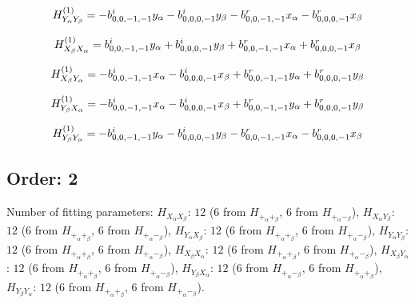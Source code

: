 \documentclass[fleqn]{article}
\begin{document}
\begin{dmath*}
H_{Y_{\alpha}Y_{\beta}}^{(1)}=-  b^{i}_{0,0,-1,-1} y_{\alpha} -  b^{i}_{0,0,0,-1} y_{\beta} -  b^{r}_{0,0,-1,-1} x_{\alpha} -  b^{r}_{0,0,0,-1} x_{\beta}\\
\end{dmath*}

\begin{dmath*}
H_{X_{\beta}X_{\alpha}}^{(1)}=b^{i}_{0,0,-1,-1} y_{\alpha} + b^{i}_{0,0,0,-1} y_{\beta} + b^{r}_{0,0,-1,-1} x_{\alpha} + b^{r}_{0,0,0,-1} x_{\beta}\\
\end{dmath*}

\begin{dmath*}
H_{X_{\beta}Y_{\alpha}}^{(1)}=-  b^{i}_{0,0,-1,-1} x_{\alpha} -  b^{i}_{0,0,0,-1} x_{\beta} +  b^{r}_{0,0,-1,-1} y_{\alpha} +  b^{r}_{0,0,0,-1} y_{\beta}\\
\end{dmath*}

\begin{dmath*}
H_{Y_{\beta}X_{\alpha}}^{(1)}=-  b^{i}_{0,0,-1,-1} x_{\alpha} -  b^{i}_{0,0,0,-1} x_{\beta} +  b^{r}_{0,0,-1,-1} y_{\alpha} +  b^{r}_{0,0,0,-1} y_{\beta}\\
\end{dmath*}

\begin{dmath*}
H_{Y_{\beta}Y_{\alpha}}^{(1)}=-  b^{i}_{0,0,-1,-1} y_{\alpha} -  b^{i}_{0,0,0,-1} y_{\beta} -  b^{r}_{0,0,-1,-1} x_{\alpha} -  b^{r}_{0,0,0,-1} x_{\beta}\\
\end{dmath*}
\subsection{Order: 2}
Number of fitting parameters: $H_{X_{\alpha}X_{\beta}}$: $12$ ($6$ from $H_{+_{\alpha}+_{\beta}}$, $6$ from $H_{+_{\alpha}-_{\beta}}$), $H_{X_{\alpha}Y_{\beta}}$: $12$ ($6$ from $H_{+_{\alpha}+_{\beta}}$, $6$ from $H_{+_{\alpha}-_{\beta}}$), $H_{Y_{\alpha}X_{\beta}}$: $12$ ($6$ from $H_{+_{\alpha}+_{\beta}}$, $6$ from $H_{+_{\alpha}-_{\beta}}$), $H_{Y_{\alpha}Y_{\beta}}$: $12$ ($6$ from $H_{+_{\alpha}+_{\beta}}$, $6$ from $H_{+_{\alpha}-_{\beta}}$), $H_{X_{\beta}X_{\alpha}}$: $12$ ($6$ from $H_{+_{\alpha}+_{\beta}}$, $6$ from $H_{+_{\alpha}-_{\beta}}$), $H_{X_{\beta}Y_{\alpha}}$: $12$ ($6$ from $H_{+_{\alpha}+_{\beta}}$, $6$ from $H_{+_{\alpha}-_{\beta}}$), $H_{Y_{\beta}X_{\alpha}}$: $12$ ($6$ from $H_{+_{\alpha}-_{\beta}}$, $6$ from $H_{+_{\alpha}+_{\beta}}$), $H_{Y_{\beta}Y_{\alpha}}$: $12$ ($6$ from $H_{+_{\alpha}+_{\beta}}$, $6$ from $H_{+_{\alpha}-_{\beta}}$).
\end{document}
